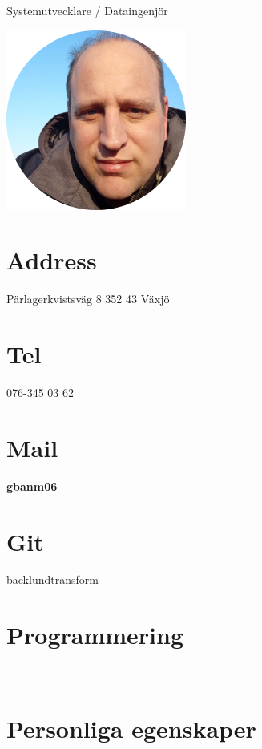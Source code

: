 \documentclass[]{friggeri-cv}
\begin{document}
      {Systemutvecklare / Dataingenjör}
      

\begin{aside}
  \includegraphics[scale=0.10]{img/jag.png}
  \section{Address}
    Pärlagerkvistsväg 8 
    352 43 Växjö
    ~
  \section{Tel}
   076-345 03 62
    ~
  \section{Mail}
    \href{mailto:gbanm06@gmail.com}{\textbf{gbanm06}}
    ~
  \section{Git}
    \href{https://github.com/backlundtransform}{backlundtransform}
    ~
  \section{Programmering}
    ~
  \section{Personliga egenskaper}
\end{aside}
~
\end{document}
